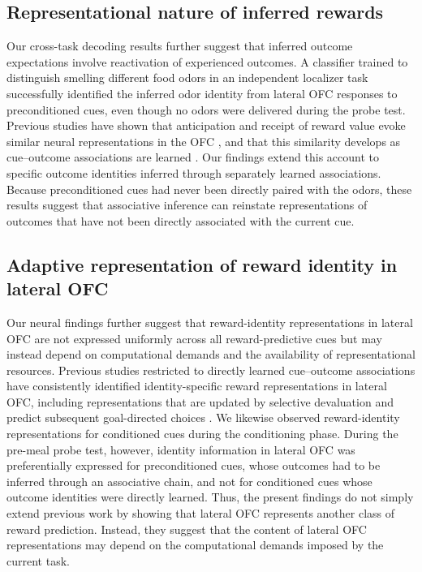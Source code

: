 \documentclass[9pt,twocolumn,twoside]{pnas-new}
\begin{document}
\subsection*{Representational nature of inferred rewards}

Our cross-task decoding results further suggest that inferred outcome expectations involve reactivation of experienced outcomes. A classifier trained to distinguish smelling different food odors in an independent localizer task successfully identified the inferred odor identity from lateral OFC responses to preconditioned cues, even though no odors were delivered during the probe test. Previous studies have shown that anticipation and receipt of reward value evoke similar neural representations in the OFC \cite{RN1}, and that this similarity develops as cue--outcome associations are learned \cite{kahnt2011decoding}. Our findings extend this account to specific outcome identities inferred through separately learned associations. Because preconditioned cues had never been directly paired with the odors, these results suggest that associative inference can reinstate representations of outcomes that have not been directly associated with the current cue.


\subsection*{Adaptive representation of reward identity in lateral OFC}

Our neural findings further suggest that reward-identity representations in lateral OFC are not expressed uniformly across all reward-predictive cues but may instead depend on computational demands and the availability of representational resources. Previous studies restricted to directly learned cue--outcome associations have consistently identified identity-specific reward representations in lateral OFC, including representations that are updated by selective devaluation and predict subsequent goal-directed choices \cite{howard2015identity,howard2017identity,howard2018identity,liuyaoatt24,witkowski2026identity}. We likewise observed reward-identity representations for conditioned cues during the conditioning phase. During the pre-meal probe test, however, identity information in lateral OFC was preferentially expressed for preconditioned cues, whose outcomes had to be inferred through an associative chain, and not for conditioned cues whose outcome identities were directly learned. Thus, the present findings do not simply extend previous work by showing that lateral OFC represents another class of reward prediction. Instead, they suggest that the content of lateral OFC representations may depend on the computational demands imposed by the current task.
\end{document}
